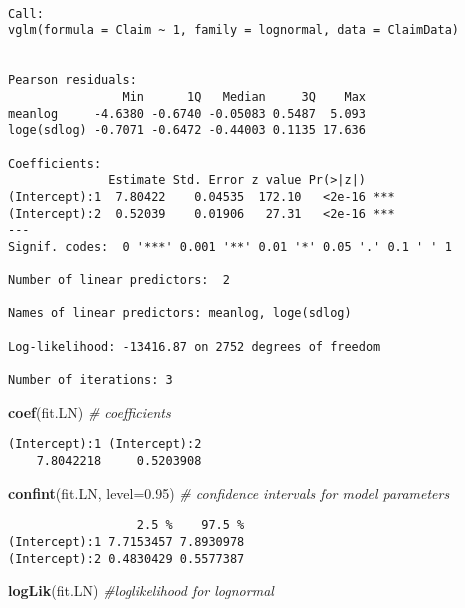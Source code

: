 \documentclass[]{book}
\newenvironment{Shaded}{\begin{snugshade}}{\end{snugshade}}
\newcommand{\KeywordTok}[1]{\textcolor[rgb]{0.13,0.29,0.53}{\textbf{#1}}}
\newcommand{\DataTypeTok}[1]{\textcolor[rgb]{0.13,0.29,0.53}{#1}}
\newcommand{\FloatTok}[1]{\textcolor[rgb]{0.00,0.00,0.81}{#1}}
\newcommand{\CommentTok}[1]{\textcolor[rgb]{0.56,0.35,0.01}{\textit{#1}}}
\newcommand{\NormalTok}[1]{#1}
\theoremstyle{definition}
\theoremstyle{definition}
\theoremstyle{definition}
\theoremstyle{remark}
\begin{document}
\begin{verbatim}

Call:
vglm(formula = Claim ~ 1, family = lognormal, data = ClaimData)


Pearson residuals:
                Min      1Q   Median     3Q    Max
meanlog     -4.6380 -0.6740 -0.05083 0.5487  5.093
loge(sdlog) -0.7071 -0.6472 -0.44003 0.1135 17.636

Coefficients: 
              Estimate Std. Error z value Pr(>|z|)    
(Intercept):1  7.80422    0.04535  172.10   <2e-16 ***
(Intercept):2  0.52039    0.01906   27.31   <2e-16 ***
---
Signif. codes:  0 '***' 0.001 '**' 0.01 '*' 0.05 '.' 0.1 ' ' 1

Number of linear predictors:  2 

Names of linear predictors: meanlog, loge(sdlog)

Log-likelihood: -13416.87 on 2752 degrees of freedom

Number of iterations: 3 
\end{verbatim}

\begin{Shaded}
\begin{Highlighting}[]
\KeywordTok{coef}\NormalTok{(fit.LN)                 }\CommentTok{# coefficients}
\end{Highlighting}
\end{Shaded}

\begin{verbatim}
(Intercept):1 (Intercept):2 
    7.8042218     0.5203908 
\end{verbatim}

\begin{Shaded}
\begin{Highlighting}[]
\KeywordTok{confint}\NormalTok{(fit.LN, }\DataTypeTok{level=}\FloatTok{0.95}\NormalTok{)  }\CommentTok{# confidence intervals for model parameters }
\end{Highlighting}
\end{Shaded}

\begin{verbatim}
                  2.5 %    97.5 %
(Intercept):1 7.7153457 7.8930978
(Intercept):2 0.4830429 0.5577387
\end{verbatim}

\begin{Shaded}
\begin{Highlighting}[]
\KeywordTok{logLik}\NormalTok{(fit.LN)               }\CommentTok{#loglikelihood for lognormal}
\end{Highlighting}
\end{Shaded}
\end{document}
